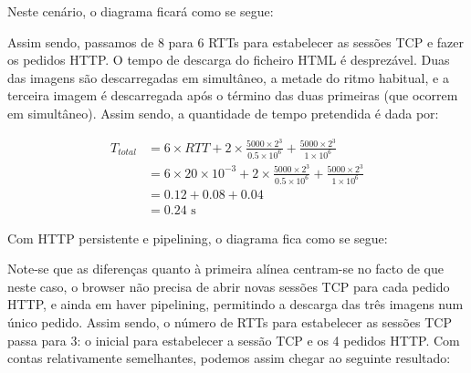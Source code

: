 \begin{enumerate}[leftmargin=\labelsep]
        Neste cenário, o diagrama ficará como se segue:

        \begin{figure}[H]
          \centering
          
        \end{figure}

        Assim sendo, passamos de 8 para 6 RTTs para estabelecer as sessões TCP e fazer
        os pedidos HTTP. O tempo de descarga do ficheiro HTML é desprezável.
        Duas das imagens são descarregadas em simultâneo, a metade do ritmo habitual,
        e a terceira imagem é descarregada após o término das duas primeiras (que ocorrem
        em simultâneo). Assim sendo, a quantidade de tempo pretendida é dada por:

        $$
          \begin{aligned}
            T_{total} & = 6 \times RTT + 2 \times \frac{5000 \times 2^3}{0.5 \times 10^6} + \frac{5000 \times 2^3}{1 \times 10^6}               \\
                      & = 6 \times 20 \times 10^{-3} + 2 \times \frac{5000 \times 2^3}{0.5 \times 10^6} + \frac{5000 \times 2^3}{1 \times 10^6} \\
                      & = 0.12 + 0.08 + 0.04                                                                                                    \\
                      & = 0.24 \text{ s}
          \end{aligned}
        $$


        Com HTTP persistente e pipelining, o diagrama fica como se segue:

        \begin{figure}[H]
          \centering
          
        \end{figure}

        Note-se que as diferenças quanto à primeira alínea centram-se no facto de que
        neste caso, o browser não precisa de abrir novas sessões TCP para cada pedido
        HTTP, e ainda em haver pipelining, permitindo a descarga das três imagens num
        único pedido. Assim sendo, o número de RTTs para estabelecer as sessões TCP passa para 3:
        o inicial para estabelecer a sessão TCP e os 4 pedidos HTTP. Com contas relativamente
        semelhantes, podemos assim chegar ao seguinte resultado:


\end{enumerate}
